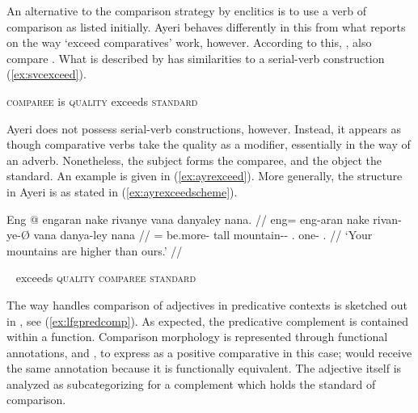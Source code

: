An alternative to the comparison strategy by enclitics is to use a verb of
comparison as listed initially. Ayeri behaves differently in this from what
\citet{wals121} reports on the way `exceed comparatives' work, however.
According to this, , also
compare \citet{beermannetal2005}. What is described by \citet{wals121} has
similarities to a serial-verb construction (\ref{ex:svcexceed}).

\ex\label{ex:svcexceed}
	\textsc{comparee} is \textsc{quality} exceeds \textsc{standard}
\xe

Ayeri does not possess serial-verb constructions, however. Instead, it appears
as though comparative verbs take the quality as a modifier, essentially in the
way of an adverb. Nonetheless, the subject forms the comparee, and the object
the standard. An example is given in (\ref{ex:ayrexceed}). More generally, the
structure in Ayeri is as stated in (\ref{ex:ayrexceedscheme}).

\ex\label{ex:ayrexceed}\begingl
	\gla Eng @ engaran nake rivanye vana danyaley nana. //
	\glb eng= eng-aran nake rivan-ye-Ø vana danya-ley nana //
	\glc \AgtTI{}= be.more-\TplI{} tall mountain-\Pl{}-\Top{} \Second{}.\Gen{}
		one-\PargI{} \Fpl{}.\Gen{} //
	\glft `Your mountains are higher than ours.' //
\endgl
\xe

\ex~\label{ex:ayrexceedscheme}%
	exceeds \textsc{quality} \textsc{comparee} \textsc{standard}
\xe

The way \Lfg{} handles comparison of adjectives in predicative contexts is
sketched out in \citet[122]{butt1999}, see (\ref{ex:lfgpredcomp}). As expected,
the predicative complement is contained within a \Plink{} function. Comparison
morphology is represented through functional annotations, \Deg{} and \Degdim{},
to express  as a positive comparative in this case; 
would receive the same annotation because it is functionally equivalent. The
adjective itself is analyzed as subcategorizing for a complement which holds
the standard of comparison.

